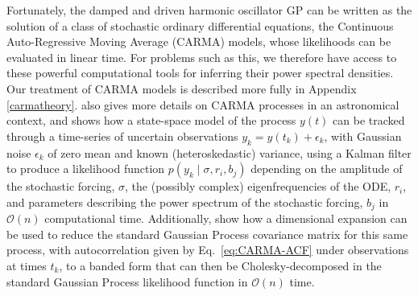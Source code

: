 \documentclass[modern]{aastex61}
\begin{document}
Fortunately, the damped and driven harmonic oscillator GP can be written as the
solution of a class of stochastic ordinary differential equations, the
Continuous Auto-Regressive Moving Average (CARMA) models, whose likelihoods can
be evaluated in linear time. For problems such as this, we therefore have access
to these powerful computational tools for inferring their power spectral
densities.  Our treatment of CARMA models is described more fully in Appendix
\ref{carmatheory}.   \citet{Kelly2014} also gives more details on CARMA
processes in an astronomical context, and shows how a state-space model of the
process $y(t)$ can be tracked through a time-series of uncertain observations
$y_k = y\left( t_k \right) + \epsilon_k$, with Gaussian noise $\epsilon_k$ of
zero mean and known (heteroskedastic) variance, using a Kalman filter to produce
a likelihood function $p\left( y_k \mid \sigma, r_i, b_j \right)$ depending on
the amplitude of the stochastic forcing, $\sigma$, the (possibly complex)
eigenfrequencies of the ODE, $r_i$, and parameters describing the power spectrum
of the stochastic forcing, $b_j$ in $\mathcal{O}\left( n \right)$ computational
time.  Additionally, \citet{Foreman-Mackey2017} show how a dimensional expansion
can be used to reduce the standard Gaussian Process covariance matrix for this
same process,  with autocorrelation given by Eq.\ \eqref{eq:CARMA-ACF} under
observations at times $t_k$, to a banded form that can then be
Cholesky-decomposed in the standard Gaussian Process likelihood function in
$\mathcal{O}\left( n \right)$ time.
\end{document}
